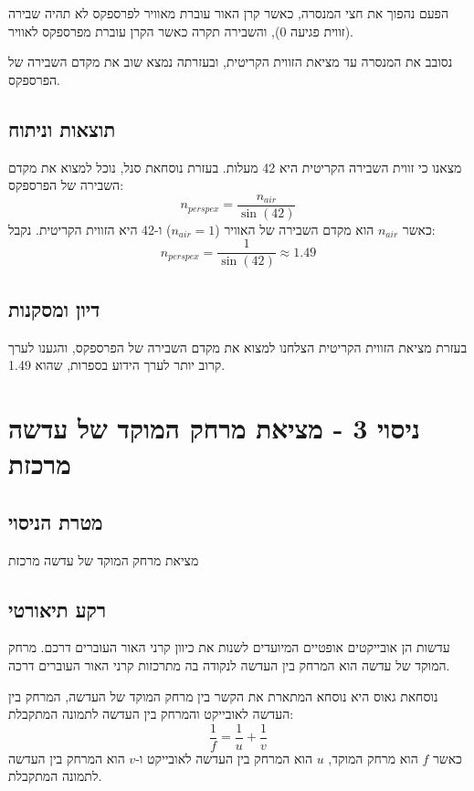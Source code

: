 \documentclass[14pt]{extarticle}
\begin{document}
הפעם נהפוך את חצי המנסרה, כאשר קרן האור עוברת מאוויר לפרספקס לא תהיה שבירה (זווית פגיעה 0), והשבירה תקרה כאשר הקרן עוברת מפרספקס לאוויר.

נסובב את המנסרה עד מציאת הזווית הקריטית, ובעזרתה נמצא שוב את מקדם השבירה של הפרספקס.

\subsection*{תוצאות וניתוח}
מצאנו כי זווית השבירה הקריטית היא 42 מעלות. בעזרת נוסחאת סנל, נוכל למצוא את מקדם השבירה של הפרספקס:
\begin{equation}
n_{perspex} = \frac{n_{air}}{\sin(42)}
\end{equation}
כאשר $n_{air}$ הוא מקדם השבירה של האוויר ($n_{air}=1$) ו-42 היא הזווית הקריטית. נקבל:
\begin{equation}
n_{perspex} = \frac{1}{\sin(42)} \approx 1.49
\end{equation}

\subsection*{דיון ומסקנות}
בעזרת מציאת הזווית הקריטית הצלחנו למצוא את מקדם השבירה של הפרספקס, והגענו לערך קרוב יותר לערך הידוע בספרות, שהוא 1.49.

\section*{ניסוי 3 - מציאת מרחק המוקד של עדשה מרכזת}
\subsection*{מטרת הניסוי}
מציאת מרחק המוקד של עדשה מרכזת
\subsection*{רקע תיאורטי}
עדשות הן אובייקטים אופטיים המיועדים לשנות את כיוון קרני האור העוברים דרכם.
מרחק המוקד של עדשה הוא המרחק בין העדשה לנקודה בה מתרכזות קרני האור העוברים דרכה.

נוסחאת גאוס היא נוסחא המתארת את הקשר בין מרחק המוקד של העדשה, המרחק בין העדשה לאובייקט והמרחק בין העדשה לתמונה המתקבלת:
\begin{equation}
\frac{1}{f} = \frac{1}{u} + \frac{1}{v}
\end{equation}
כאשר $f$ הוא מרחק המוקד, $u$ הוא המרחק בין העדשה לאובייקט ו-$v$ הוא המרחק בין העדשה לתמונה המתקבלת.
\end{document}
